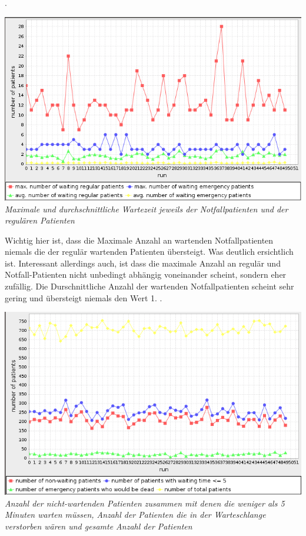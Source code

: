 \documentclass{article}
\begin{document}
.\\
\begin{center}
\includegraphics[scale=0.4]{img/max_avg_patients.png}\\
\textit{Maximale und durchschnittliche Wartezeit jeweils der Notfallpatienten und der regulären Patienten}\\
\end{center}
Wichtig hier ist, dass die Maximale Anzahl an wartenden Notfallpatienten niemals die der regulär wartenden Patienten übersteigt. Was deutlich ersichtlich ist. Interessant allerdings auch, ist dass die maximale Anzahl an regulär und Notfall-Patienten nicht unbedingt abhängig voneinander scheint, sondern eher zufällig. Die Durschnittliche Anzahl der wartenden Notfallpatienten scheint sehr gering und übersteigt niemals den Wert 1.
.\\
\begin{center}
\includegraphics[scale=0.4]{img/not_less_waiting.png}\\
\textit{Anzahl der nicht-wartenden Patienten zusammen mit denen die weniger als 5 Minuten warten müssen, Anzahl der Patienten die in der Warteschlange verstorben wären und gesamte Anzahl der Patienten}\\
\end{center}
\end{document}

